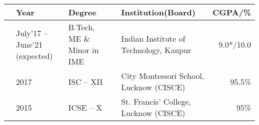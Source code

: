
\newcommand{\education}[4]{
  & #1 & #2 & &#3 & #4
}
\begin{center}
\begin{tabular}{ | L{0.05cm} l | L{3cm} | L{0.05cm} C{7cm} | r |}
  \hline
  \education{\textbf{Year}}{\textbf{Degree}}{\textbf{Institution(Board)}}{\textbf{CGPA/\%}}\\
  \hline
  \education{July'17 -- June'21 (expected)}{B.Tech, ME \& Minor in IME}{Indian Institute of Technology, Kanpur}{9.0*/10.0}\\
  \education{2017}{ISC -- XII}{City Montessori School, Lucknow (CISCE)}{95.5\%}\\
  \education{2015}{ICSE -- X}{St. Francis' College, Lucknow (CISCE)}{95\%}\\
  \hline
\end{tabular}
\end{center}
\vspace{-4mm}

